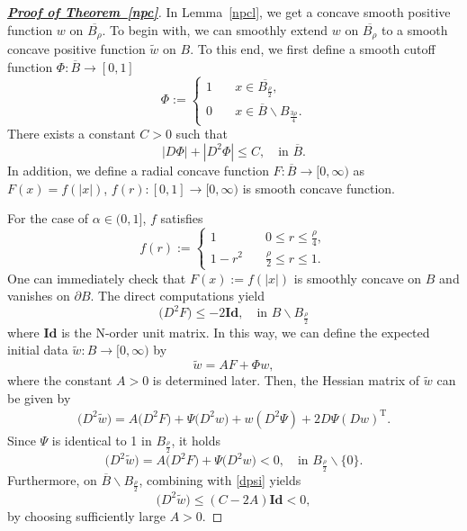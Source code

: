 \documentclass[10pt]{article}         %
\numberwithin{equation}{section}
\begin{document}
\begin{proof}[\textbf{\emph{\underline{Proof of Theorem~\ref{npc}}}}]In Lemma~\ref{npcl}, we get a concave smooth positive function $w$ on $\overline{B_{\rho}}$. To begin with, we can smoothly extend $w$ on $\overline{B_\rho}$ to a smooth concave positive function $\tilde{w}$ on $B$. %
To this end, we first define a smooth cutoff function $\Phi:\overline{B}\to[0,1]$
\begin{equation*}
   \Phi:=\begin{cases}1\quad  &x\in\overline{B_{\frac{\rho}{2}}},\\
   0\quad &x\in\overline{B}\backslash B_{\frac{3\rho}{4}}.
   \end{cases}
\end{equation*}
There exists a constant $C>0$ such that 
\begin{equation}\label{dpsi}
    |D\Phi|+|D^2\Phi|\leq C,\quad\text{in }\overline{B}.
\end{equation}
In addition, we define a radial concave function $F:\overline{B}\to[0,\infty)$ as $F(x)=f(|x|)$, $f(r):[0,1]\to [0,\infty)$ is smooth concave function. 

For the case of $\alpha\in(0,1]$, $f$ satisfies
\begin{equation*}
    f(r):=\begin{cases}1\quad &0\leq r\leq \frac{\rho}{4},\\
        1-r^2 \quad &\frac{\rho}{2}\leq r\leq 1.
    \end{cases}
\end{equation*}
One can immediately check that  $F(x):=f(|x|)$ is smoothly concave on $B$ and vanishes on $\partial B$. %
The direct computations yield 
\begin{equation*}
    \big( D^2F \big)\leq -2\textbf{Id},\quad\text{in }B\backslash B_{\frac{\rho}{2}}
\end{equation*}
where $\textbf{Id}$ is the N-order unit matrix. 
In this way, we can define the expected initial data $\tilde{w}:B\to[0,\infty)$ by 
\[\tilde{w}=A F+\Phi w,\]
where the constant $A>0$ is determined later. Then, the Hessian matrix of $\tilde{w}$ can be given by 
\begin{equation*}
\begin{aligned}
    \big(D^2\tilde{w}\big)=A\big(D^2 F\big)+\Psi \big(D^2w\big)+w(D^2\Psi)+2D\Psi (D w)^\mathrm{T}.
\end{aligned}
\end{equation*}
Since $\Psi$ is identical to 1 in $B_{\frac{\rho}{2}}$, it holds 
\[\big(D^2\tilde{w}\big)=A\big(D^2 F\big)+\Psi \big(D^2w\big)<0,\quad \text{in }B_{\frac{\rho}{2}}\backslash\{0\}.\]
Furthermore, on $\overline{B}\backslash B_{\frac{\rho}{2}}$,   combining with \eqref{dpsi} yields
\[\big(D^2\tilde{w}\big)\leq (C-2A)\textbf{Id}<0,\]
by choosing sufficiently large $A>0$. 


\end{proof}
\end{document}
